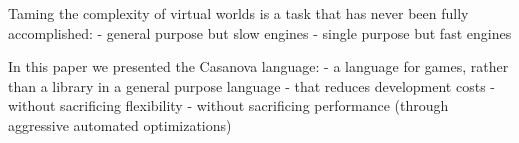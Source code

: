 
Taming the complexity of virtual worlds is a task that has never been fully accomplished:
- general purpose but slow engines 
- single purpose but fast engines

In this paper we presented the Casanova language:
- a language for games, rather than a library in a general purpose language
- that reduces development costs
- without sacrificing flexibility
- without sacrificing performance (through aggressive automated optimizations)

